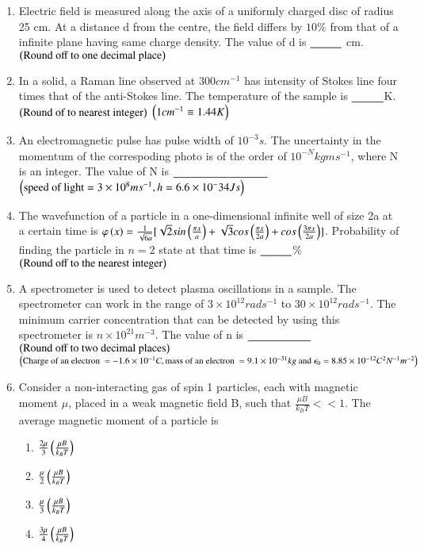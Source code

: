 \documentclass[journal,12pt,onecolumn]{IEEEtran}
\theoremstyle{remark}
\begin{document}
\begin{enumerate}
\item Electric field is measured along the axis of a uniformly charged disc of radius 25 cm. At a distance d from the centre, the field differs by $10\%$ from that of a infinite plane having same charge density. The value of d is $\makebox[1cm][l]{\underline{\hspace{1cm}}}$ cm.
$\left(\text{Round off to one decimal place}\right)$

\item In a solid, a Raman line observed at $300 cm^{-1}$ has intensity of Stokes line four times that of the anti-Stokes line. The temperature of the sample is $\makebox[1cm][l]{\underline{\hspace{1cm}}}$K.
$\left(\text{Round of to nearest integer}\right)$
$\left(1cm^{-1} \equiv 1.44K\right)$

\item An electromagnetic pulse has pulse width of $10^{-3} s$. The uncertainty in the momentum of the correspoding photo is of the order of $10^{-N} kg m s^{-1}$, where N is an integer. The value of N is $\makebox[3cm][l]{\underline{\hspace{3cm}}}$ 
$\left(\text{speed of light}= 3 \times 10^8 m s^{-1}, h= 6.6 \times 10^-34 Js\right)$

\item The wavefunction of a particle in a one-dimensional infinite well of size 2a at a certain time is $\varphi \left(x\right) = \frac{1}{\sqrt{6a}}[\sqrt{2}sin\left(\frac{\pi x}{a}\right) + \sqrt{3}cos\left(\frac{\pi x}{2a}\right) + cos\left(\frac{3\pi x}{2a}\right)]$. Probability of finding the particle in $n=2$ state at that time is $\makebox[1cm][l]{\underline{\hspace{1cm}}}$$\%$ 
$\left(\text{Round off to the nearest integer}\right)$

\item A spectrometer is used to detect plasma oscillations in a sample. The spectrometer can work in the range of $3 \times 10^{12} rad s^{-1}$ to $30 \times 10^{12} rad s^{-1}$. The minimum carrier concentration that can be detected by using this spectrometer is $n \times 10^{21} m^{-3}$. The value of n is $\makebox[2cm][l]{\underline{\hspace{2cm}}}$
$\left(\text{Round off to two decimal places}\right)$
$\left(\text{Charge of an electron }= -1.6 \times 10^{-1}C, \text{mass of an electron }= 9.1 \times 10^{-31}kg \text{ and } \epsilon_0 = 8.85 \times 10^{-12} C^2 N^{-1} m^{-2}\right)$

\item Consider a non-interacting gas of spin 1 particles, each with magnetic moment $\mu$, placed in a weak magnetic field B, such that $\frac{\mu B}{k_B T} << 1$. The average magnetic moment of a particle is 
\begin{enumerate}
    \item $\frac{2\mu}{3} \left(\frac{\mu B}{k_B T}\right)$
    \item $\frac{\mu}{2} \left(\frac{\mu B}{k_B T}\right)$
    \item $\frac{\mu}{3} \left(\frac{\mu B}{k_B T}\right)$
    \item $\frac{3\mu}{4} \left(\frac{\mu B}{k_B T}\right)$
\end{enumerate}


\end{enumerate}
\end{document}
